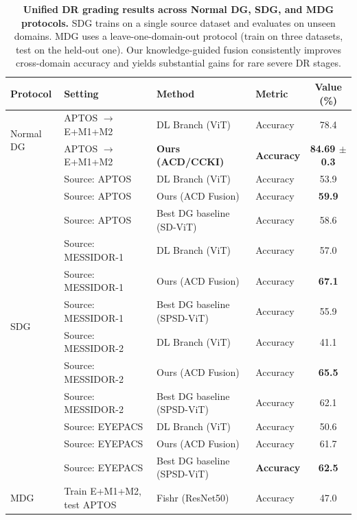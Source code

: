 \documentclass[runningheads]{llncs}
\begin{document}
\begin{table}[h]
\centering
\tiny
\setlength{\tabcolsep}{4.5pt}

\caption{\textbf{Unified DR grading results across Normal DG, SDG, and MDG protocols.} 
SDG trains on a single source dataset and evaluates on unseen domains. 
MDG uses a leave-one-domain-out protocol (train on three datasets, test on the held-out one). 
Our knowledge-guided fusion consistently improves cross-domain accuracy and yields substantial gains for rare severe DR stages.}

\begin{tabular}{llllc}
\toprule
\textbf{Protocol} & \textbf{Setting} & \textbf{Method} & \textbf{Metric} & \textbf{Value (\%)} \\
\midrule
\multirow{2}{*}{Normal DG} 
  & APTOS $\rightarrow$ E+M1+M2
  & DL Branch (ViT) & Accuracy & 78.4 \\
  & APTOS $\rightarrow$ E+M1+M2
  & \textbf{Ours (ACD/CCKI)} & \textbf{Accuracy} & \textbf{84.69 $\pm$ 0.3} \\
\midrule
\multirow{12}{*}{SDG} 
  & Source: APTOS 
  & DL Branch (ViT) & Accuracy & 53.9 \\
  & Source: APTOS 
  & Ours (ACD Fusion) & Accuracy & \textbf{59.9} \\
  & Source: APTOS 
  & Best DG baseline (SD-ViT) & Accuracy & 58.6 \\[0.2em]
  & Source: MESSIDOR-1 
  & DL Branch (ViT) & Accuracy & 57.0 \\
  & Source: MESSIDOR-1 
  & Ours (ACD Fusion) & Accuracy & \textbf{67.1} \\
  & Source: MESSIDOR-1 
  & Best DG baseline (SPSD-ViT) & Accuracy & 55.9 \\[0.2em]
  & Source: MESSIDOR-2 
  & DL Branch (ViT) & Accuracy & 41.1 \\
  & Source: MESSIDOR-2 
  & Ours (ACD Fusion) & Accuracy & \textbf{65.5} \\
  & Source: MESSIDOR-2 
  & Best DG baseline (SPSD-ViT) & Accuracy & 62.1 \\[0.2em]
  & Source: EYEPACS 
  & DL Branch (ViT) & Accuracy & 50.6 \\
  & Source: EYEPACS 
  & Ours (ACD Fusion) & Accuracy & 61.7 \\
  & Source: EYEPACS 
  & Best DG baseline (SPSD-ViT) & \textbf{Accuracy} & \textbf{62.5} \\
\midrule
\multirow{5}{*}{MDG} 
  & Train E+M1+M2, test APTOS 
  & Fishr (ResNet50) & Accuracy & 47.0 \\

\end{tabular}
\end{table}
\end{document}
